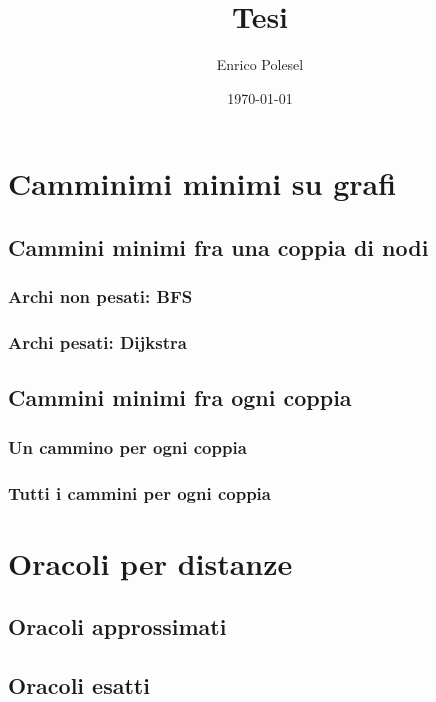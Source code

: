 \documentclass[a4paper,10pt]{amsbook}
\title{Tesi}
\author{Enrico Polesel}
\date{\today}
\newcounter{counter1}
\theoremstyle{plain}
\theoremstyle{definition}
\theoremstyle{remark}
\begin{document}
\maketitle

\setcounter{tocdepth}{5}

\tableofcontents

\chapter{Camminimi minimi su grafi}

\section{Cammini minimi fra una coppia di nodi}

\subsection{Archi non pesati: BFS}

\subsection{Archi pesati: Dijkstra}

\section{Cammini minimi fra ogni coppia}

\subsection{Un cammino per ogni coppia}

\subsection{Tutti i cammini per ogni coppia}

\chapter{Oracoli per distanze}

\section{Oracoli approssimati}

\section{Oracoli esatti}
\end{document}

